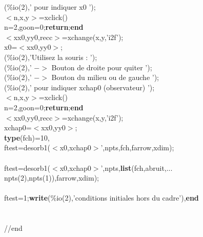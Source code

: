 {\begin{flushleft}
{\cmarg \hspace{2.5cm}{\bf write}(\%io(2),'      pour indiquer x0 ');\\ 
\cmarg \hspace{2.5cm}$<$n,x,y$>$=xclick()\\ 
\cmarg \hspace{2.5cm}{\bf if} n=2,goon=0;{\bf return};{\bf end}\\ 
\cmarg \hspace{2.5cm}$<$xx0,yy0,recc$>$=xchange(x,y,'i2f');\\ 
\cmarg \hspace{2.5cm}x0=$<$xx0,yy0$>$;\\ 
\cmarg \hspace{2.5cm}{\bf write}(\%io(2),'Utilisez la souris : ');\\ 
\cmarg \hspace{2.5cm}{\bf write}(\%io(2),' $-$$>$ Bouton de droite pour quiter ');\\ 
\cmarg \hspace{2.5cm}{\bf write}(\%io(2),' $-$$>$ Bouton du milieu ou de gauche ');\\ 
\cmarg \hspace{2.5cm}{\bf write}(\%io(2),'      pour indiquer xchap0 (observateur) ');\\ 
\cmarg \hspace{2.5cm}$<$n,x,y$>$=xclick()\\ 
\cmarg \hspace{2.5cm}{\bf if} n=2,goon=0;{\bf return};{\bf end}\\ 
\cmarg \hspace{2.5cm}$<$xx0,yy0,recc$>$=xchange(x,y,'i2f');\\ 
\cmarg \hspace{2.5cm}xchap0=$<$xx0,yy0$>$;\\ 
\cmarg \hspace{2.5cm}{\bf if} {\bf type}(fch)=10,\\ 
\cmarg \hspace{3.2cm}ftest=desorb1($<$x0,xchap0$>$',npts,fch,farrow,xdim);\\ 
\cmarg \hspace{2.5cm}{\bf else} \\ 
\cmarg \hspace{3.2cm}ftest=desorb1($<$x0,xchap0$>$',npts,{\bf list}(fch,abruit,...\\ 
\cmarg \hspace{6.2cm}npts(2),npts(1)),farrow,xdim);             \\ 
\cmarg \hspace{2.5cm}{\bf end}\\ 
\cmarg \hspace{2.5cm}{\bf if} ftest=1;{\bf write}(\%io(2),'conditions initiales hors du cadre'),{\bf end}\\ 
\cmarg \hspace{1.8cm}{\bf end}\\ 
\cmarg \hspace{0.5cm}{\bf end}\\ 
\cmarg //end}
\end{flushleft}}



